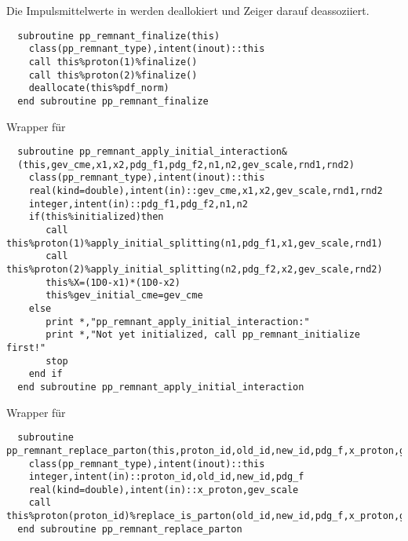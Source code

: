 Die Impulsmittelwerte in  werden deallokiert und Zeiger darauf deassoziiert.
\begin{Verbatim}
  subroutine pp_remnant_finalize(this)
    class(pp_remnant_type),intent(inout)::this
    call this%proton(1)%finalize()
    call this%proton(2)%finalize()
    deallocate(this%pdf_norm)
  end subroutine pp_remnant_finalize
\end{Verbatim}
Wrapper für 
\begin{Verbatim}
  subroutine pp_remnant_apply_initial_interaction&
  (this,gev_cme,x1,x2,pdg_f1,pdg_f2,n1,n2,gev_scale,rnd1,rnd2)
    class(pp_remnant_type),intent(inout)::this
    real(kind=double),intent(in)::gev_cme,x1,x2,gev_scale,rnd1,rnd2
    integer,intent(in)::pdg_f1,pdg_f2,n1,n2
    if(this%initialized)then
       call this%proton(1)%apply_initial_splitting(n1,pdg_f1,x1,gev_scale,rnd1)
       call this%proton(2)%apply_initial_splitting(n2,pdg_f2,x2,gev_scale,rnd2)
       this%X=(1D0-x1)*(1D0-x2)
       this%gev_initial_cme=gev_cme
    else
       print *,"pp_remnant_apply_initial_interaction:"
       print *,"Not yet initialized, call pp_remnant_initialize first!"
       stop
    end if
  end subroutine pp_remnant_apply_initial_interaction
\end{Verbatim}
Wrapper für 
\begin{Verbatim}
  subroutine pp_remnant_replace_parton(this,proton_id,old_id,new_id,pdg_f,x_proton,gev_scale)
    class(pp_remnant_type),intent(inout)::this
    integer,intent(in)::proton_id,old_id,new_id,pdg_f
    real(kind=double),intent(in)::x_proton,gev_scale
    call this%proton(proton_id)%replace_is_parton(old_id,new_id,pdg_f,x_proton,gev_scale)
  end subroutine pp_remnant_replace_parton
\end{Verbatim}
